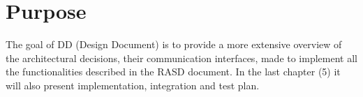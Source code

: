 \section{Purpose}
The goal of DD (Design Document) is to provide a more extensive overview of the architectural decisions, their communication interfaces, made to implement all the functionalities described in the RASD document.
In the last chapter (5) it will also present implementation, integration and test plan.

